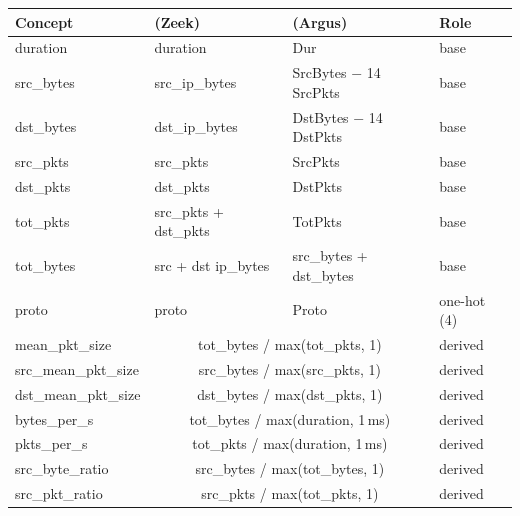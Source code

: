 \begin{tabular}{llll}
\toprule
Concept & \DA{} (Zeek) & \DB{} (Argus) & Role \\
\midrule
duration & duration & Dur & base \\
src\_bytes & src\_ip\_bytes & SrcBytes $-$ 14\,SrcPkts & base \\
dst\_bytes & dst\_ip\_bytes & DstBytes $-$ 14\,DstPkts & base \\
src\_pkts & src\_pkts & SrcPkts & base \\
dst\_pkts & dst\_pkts & DstPkts & base \\
tot\_pkts & src\_pkts + dst\_pkts & TotPkts & base \\
tot\_bytes & src + dst ip\_bytes & src\_bytes + dst\_bytes & base \\
proto & proto & Proto & one-hot (4) \\
mean\_pkt\_size & \multicolumn{2}{c}{tot\_bytes / max(tot\_pkts, 1)} & derived \\
src\_mean\_pkt\_size & \multicolumn{2}{c}{src\_bytes / max(src\_pkts, 1)} & derived \\
dst\_mean\_pkt\_size & \multicolumn{2}{c}{dst\_bytes / max(dst\_pkts, 1)} & derived \\
bytes\_per\_s & \multicolumn{2}{c}{tot\_bytes / max(duration, 1\,ms)} & derived \\
pkts\_per\_s & \multicolumn{2}{c}{tot\_pkts / max(duration, 1\,ms)} & derived \\
src\_byte\_ratio & \multicolumn{2}{c}{src\_bytes / max(tot\_bytes, 1)} & derived \\
src\_pkt\_ratio & \multicolumn{2}{c}{src\_pkts / max(tot\_pkts, 1)} & derived \\
\bottomrule
\end{tabular}
